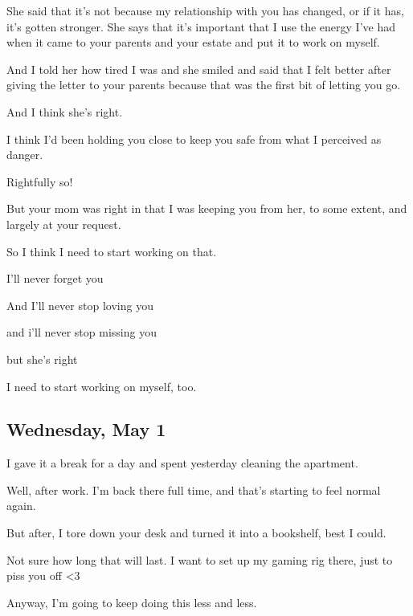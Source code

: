 { She said that it's not because my relationship with you has changed, or if it has, it's gotten stronger. She says that it's important that I use the energy I've had when it came to your parents and your estate and put it to work on myself.

 And I told her how tired I was and she smiled and said that I felt better after giving the letter to your parents because that was the first bit of letting you go.

 And I think she's right.

 I think I'd been holding you close to keep you safe from what I perceived as danger.

 Rightfully so!

 But your mom was right in that I was keeping you from her, to some extent, and largely at your request.

 So I think I need to start working on that.

 I'll never forget you

 And I'll never stop loving you

 and i'll never stop missing you

 but she's right

 I need to start working on myself, too.

\newpage

\subsection*{Wednesday, May 1}\label{wednesday-may-1}

 I gave it a break for a day and spent yesterday cleaning the apartment.

 Well, after work. I'm back there full time, and that's starting to feel normal again.

 But after, I tore down your desk and turned it into a bookshelf, best I could.

 Not sure how long that will last. I want to set up my gaming rig there, just to piss you off \textless{}3

 Anyway, I'm going to keep doing this less and less.

}
